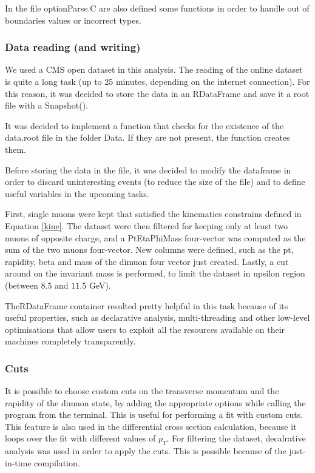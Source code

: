 \documentclass[a4paper,11pt]{article}
\begin{document}
In the file optionParse.C are also defined some functions in order to handle out of boundaries values or incorrect types.

\subsubsection{Data reading (and writing)}
We used a CMS open dataset in this analysis. The reading of the online dataset is quite a long task (up to 25 minutes, depending on the internet connection). For this reason, it was decided to store the data in an RDataFrame and save it a root file with a Snapshot().


It was decided to implement a function that checks for the existence of the data.root file in the folder Data. If they are not present, the function creates them.

Before storing the data in the file, it was decided to modify the dataframe in order to discard uninteresting events (to reduce the size of the file) and to define useful variables in the upcoming tasks.

First, single muons were kept that satisfied the kinematics constrains defined in Equation \eqref{kine}. The dataset were then filtered for keeping only at least two muons of opposite charge, and a PtEtaPhiMass four-vector was computed as the sum of the two muons four-vector. New columns were defined, such as the pt, rapidity, beta and mass of the dimuon four vector just created. Lastly, a cut around on the invariant mass is performed, to limit the dataset in upsilon region (between $8.5$ and $11.5$ GeV).

 TheRDataFrame container resulted pretty helpful in this task because of its useful properties, such as declarative analysis, multi-threading and other low-level optimisations that allow users to exploit all the resources available on their machines completely transparently.
 
\subsubsection{Cuts}
It is possible to choose custom cuts on the transverse momentum and the rapidity of the dimuon state, by adding the appropriate options while calling the program from the terminal. This is useful for performing a fit with custom cuts. This feature is also used in the differential cross section calculation, because it loops over the fit with different values of $p_T$.
For filtering the dataset, decalrative analysis was used in order to apply the cuts. This is possible because of the just-in-time compilation.
\end{document}
